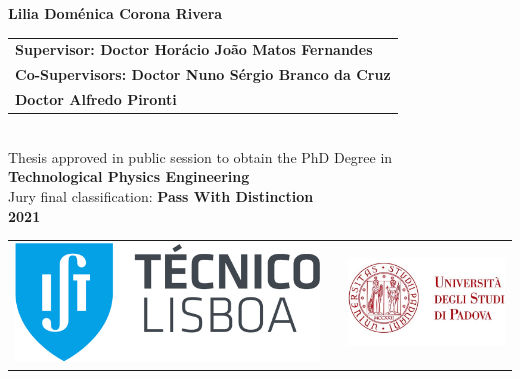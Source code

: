 {\vspace{2cm}
{\FontNam \textbf{Lilia Dom\'enica Corona Rivera}} \\
\vspace{2cm}
{\FontS %
\begin{tabular}{l}
	\FontL
\textbf{Supervisor: Doctor Hor\'acio João Matos Fernandes} \\
	\FontL\textbf{Co-Supervisors: Doctor Nuno Sérgio Branco da Cruz}\\
	\FontL\textbf{\hspace{4.05cm} Doctor Alfredo Pironti}\\
\end{tabular} } \\
\vspace{1.8cm}
{\FontM Thesis approved in public session to obtain the PhD Degree in} \\
\vspace{1.8mm}
{\FontL \textbf{Technological Physics Engineering}} \\
\vspace{1.8cm}
{\FontL Jury final classification: \textbf{Pass With Distinction}}\\
\vspace{1.8cm}
{\FontM \textbf{2021}} \\


\newpage
\thispagestyle{empty}




\begin{tabular}{>{\raggedleft}m{5cm}>{\centering}m{\dimexpr\textwidth - 10cm\relax}>{\raggedright}m{5cm}}
	\includegraphics[width=\linewidth]{includes/LogoIST.pdf}%
	&
	&%
	\includegraphics[width=\linewidth]{includes/LogoPadova.jpg} %
\end{tabular}

}
